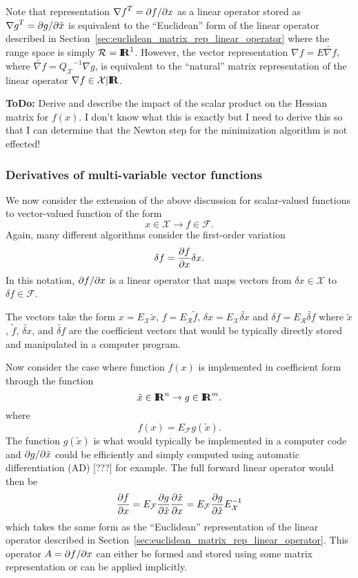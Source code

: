 Note that representation ${\nabla f}^T = {}\partial f / \partial x$ as a linear operator
stored as ${\nabla g}^T = {}\partial g / \partial \tilde{x}$ is equivalent to the
``Euclidean'' form of the linear operator described in
Section~\ref{sec:euclidean_matrix_rep_linear_operator} where the range space
is simply $\mathcal{R}=\mbox{\textbf{I}}\hspace{-0.6ex}\mbox{\textbf{R}}^1$.  However, the vector representation $\nabla f =
E {}\tilde{\nabla f}$, where $\tilde{\nabla f} = {Q_{\mathcal{X}}}^{-1}
{}\nabla g$, is equivalent to the ``natural'' matrix representation of the
linear operator $\nabla f\in\mathcal{X}|\mbox{\textbf{I}}\hspace{-0.6ex}\mbox{\textbf{R}}$.

{}\textbf{ToDo:} Derive and describe the impact of the scalar product on the
Hessian matrix for $f(x)$.  I don't know what this is exactly but I need to
derive this so that I can determine that the Newton step for the minimization
algorithm is not effected!

\subsubsection{Derivatives of multi-variable vector functions}
\label{sec:vector_function_derivatives}

We now consider the extension of the above discussion for scalar-valued
functions to vector-valued function of the form
\[
x\in\mathcal{X} \rightarrow f\in\mathcal{F}.
\]
Again, many different algorithms consider the first-order variation
\[
\delta f = \displaystyle{\frac{\partial f}{\partial x}} \delta x.
\]
In this notation, $\partial f / \partial x$ is a linear operator that maps vectors from
$\delta x\in\mathcal{X}$ to $\delta f\in\mathcal{F}$.

The vectors take the form $x = E_{\mathcal{X}} {}\tilde{x}$, $f =
E_{\mathcal{R}} {}\tilde{f}$, $\delta x = E_{\mathcal{X}} {}\tilde{\delta x}$
and $\delta f = E_{\mathcal{R}} {}\tilde{\delta f}$ where ${}\tilde{x}$,
${}\tilde{f}$, ${}\tilde{\delta x}$, and ${}\tilde{\delta f}$ are the
coefficient vectors that would be typically directly stored and manipulated in
a computer program.

Now consider the case where function $f(x)$ is implemented in coefficient form
through the function
%
\[
\tilde{x}\in\mbox{\textbf{I}}\hspace{-0.6ex}\mbox{\textbf{R}}^n \rightarrow g\in\mbox{\textbf{I}}\hspace{-0.6ex}\mbox{\textbf{R}}^m.
\]
%
where
%
\[
f(x) = E_{\mathcal{F}} g(\tilde{x}).
\]
%
The function $g(\tilde{x})$ is what would typically be implemented in a
computer code and $\partial g / \partial \tilde{x}$ could be efficiently and simply
computed using automatic differentiation (AD) [???] for example.  The full
forward linear operator would then be
%
\begin{equation}
\displaystyle{\frac{\partial f}{\partial x}} = E_{\mathcal{F}} \displaystyle{\frac{\partial g}{\partial \tilde{x}}} \displaystyle{\frac{\partial \tilde{x}}{\partial x}}  = E_{\mathcal{F}} \displaystyle{\frac{\partial g}{\partial \tilde{x}}} E_{\mathcal{X}}^{-1}
\label{eqn:d_f_d_x_euclidean}
\end{equation}
%
which takes the same form as the ``Euclidean'' representation of the linear
operator described in Section~\ref{sec:euclidean_matrix_rep_linear_operator}.
This operator $A = \partial f / \partial x$ can either be formed and stored using some
matrix representation or can be applied implicitly.

